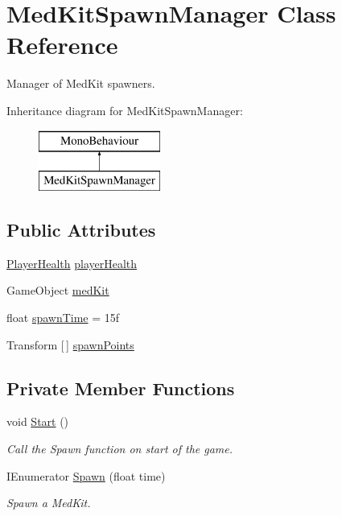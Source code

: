 \hypertarget{class_med_kit_spawn_manager}{}\section{Med\+Kit\+Spawn\+Manager Class Reference}
\label{class_med_kit_spawn_manager}


Manager of Med\+Kit spawners.  


Inheritance diagram for Med\+Kit\+Spawn\+Manager\+:\begin{figure}[H]
\begin{center}
\leavevmode
\includegraphics[height=2.000000cm]{class_med_kit_spawn_manager}
\end{center}
\end{figure}
\subsection*{Public Attributes}
\begin{DoxyCompactItemize}
\item 
\mbox{\hyperlink{class_player_health}{Player\+Health}} \mbox{\hyperlink{class_med_kit_spawn_manager_af9b64da2dcd836723791148aa78cb6ba}{player\+Health}}
\item 
Game\+Object \mbox{\hyperlink{class_med_kit_spawn_manager_a7d21e6e883f70f8235494041e37c0e91}{med\+Kit}}
\item 
float \mbox{\hyperlink{class_med_kit_spawn_manager_ad4d2f8bf1b851fd3c2049ad92d432fd5}{spawn\+Time}} = 15f
\item 
Transform \mbox{[}$\,$\mbox{]} \mbox{\hyperlink{class_med_kit_spawn_manager_a08e4d7cce7756ec457daa6bf4bddaa94}{spawn\+Points}}
\end{DoxyCompactItemize}
\subsection*{Private Member Functions}
\begin{DoxyCompactItemize}
\item 
void \mbox{\hyperlink{class_med_kit_spawn_manager_ae2b648dc825452905358189902b7df2e}{Start}} ()
\begin{DoxyCompactList}\small\item\em Call the Spawn function on start of the game. \end{DoxyCompactList}\item 
I\+Enumerator \mbox{\hyperlink{class_med_kit_spawn_manager_acb9074cfc83743c027e223fa29a8ec35}{Spawn}} (float time)
\begin{DoxyCompactList}\small\item\em Spawn a Med\+Kit. \end{DoxyCompactList}\end{DoxyCompactItemize}


